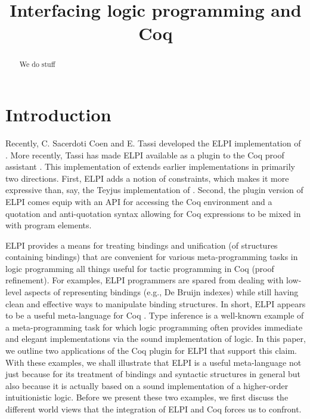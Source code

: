 \documentclass[a4paper,USenglish,cleveref, autoref, thm-restate]{lipics-v2019}
\title{Interfacing logic programming and Coq} %
\begin{document}
\maketitle

\begin{abstract}
We do stuff
\end{abstract}

\section{Introduction}
\label{sec:intro}

Recently, C. Sacerdoti Coen and E. Tassi developed the ELPI
implementation \cite{dunchev15lpar} of \lP \cite{miller12proghol}.
More recently, Tassi has made ELPI available as a plugin to the Coq
proof assistant \cite{tassi18coqpl}.  This implementation of \lP
extends earlier implementations in primarily two directions.  First,
ELPI adds a notion of constraints, which makes it more expressive than,
say, the Teyjus implementation of \lP \cite{nadathur99cade}.  Second,
the plugin version of ELPI comes equip with an API for accessing the
Coq environment and a quotation and anti-quotation syntax allowing for
Coq expressions to be mixed in with \lP program elements.

ELPI provides a means for treating bindings and unification (of
structures containing bindings) that are convenient for various
meta-programming tasks in logic programming all things useful for
tactic programming in Coq (proof refinement).  For examples, ELPI
programmers are spared from dealing with low-level aspects of
representing bindings (e.g., De Bruijn indexes) while still having
clean and effective ways to manipulate binding structures.  In short,
ELPI appears to be a useful meta-language for Coq
\cite{coen19mscs,tassi18coqpl,tassi19itp}.  
Type inference is a well-known example of a meta-programming task for
which logic programming often provides immediate and elegant
implementations via the sound implementation of logic.  %
In this paper, we outline
two applications of the Coq plugin for ELPI that support this claim.
With these examples, we shall illustrate that ELPI is a useful
meta-language not just because for its treatment of bindings and
syntactic structures in general but also because it is actually based
on a sound implementation of a higher-order intuitionistic logic.
Before we present these two examples, we
first discuss the different world views that the integration of ELPI
and Coq forces us to confront.
\end{document}
